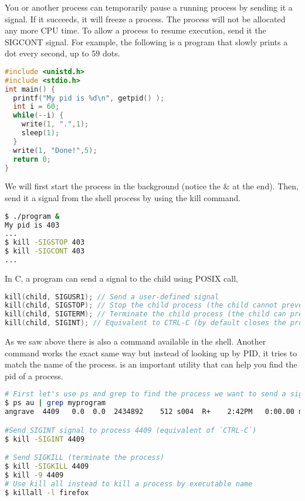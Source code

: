 You or another process can temporarily pause a running process by sending it a  signal.
If it succeeds, it will freeze a process.
The process will not be allocated any more CPU time.
To allow a process to resume execution, send it the SIGCONT signal.
For example, the following is a program that slowly prints a dot every second, up to 59 dots.

\begin{lstlisting}[language=C]
#include <unistd.h>
#include <stdio.h>
int main() {
  printf("My pid is %d\n", getpid() );
  int i = 60;
  while(--i) {
    write(1, ".",1);
    sleep(1);
  }
  write(1, "Done!",5);
  return 0;
}
\end{lstlisting}

We will first start the process in the background (notice the \& at the end).
Then, send it a signal from the shell process by using the kill command.

\begin{lstlisting}[language=bash]
$ ./program &
My pid is 403
...
$ kill -SIGSTOP 403
$ kill -SIGCONT 403
...
\end{lstlisting}

In C, a program can send a signal to the child using  POSIX call,

\begin{lstlisting}[language=C]
kill(child, SIGUSR1); // Send a user-defined signal
kill(child, SIGSTOP); // Stop the child process (the child cannot prevent this)
kill(child, SIGTERM); // Terminate the child process (the child can prevent this)
kill(child, SIGINT); // Equivalent to CTRL-C (by default closes the process)
\end{lstlisting}

As we saw above there is also a  command available in the shell.
Another command  works the exact same way but instead of looking up by \gls{PID}, it tries to match the name of the process.
 is an important utility that can help you find the pid of a process.

\begin{lstlisting}[language=bash]
# First let's use ps and grep to find the process we want to send a signal to
$ ps au | grep myprogram
angrave  4409   0.0  0.0  2434892    512 s004  R+    2:42PM   0:00.00 myprogram 1 2 3

#Send SIGINT signal to process 4409 (equivalent of `CTRL-C`)
$ kill -SIGINT 4409

# Send SIGKILL (terminate the process)
$ kill -SIGKILL 4409
$ kill -9 4409
# Use kill all instead to kill a process by executable name
$ killall -l firefox
\end{lstlisting}

